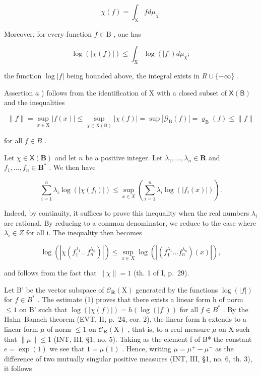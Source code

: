 \[
\chi (f) = \int_ {\mathrm{X}} f d \mu_ {\chi}.
\]

Moreover, for every function \(f \in \mathrm{B}\) , one has

\[
\log (| \chi (f) |) \leqslant \int_ {\mathrm{X}} \log (| f |) d \mu_ {\chi};
\]

the function \(\log|f|\) being bounded above, the integral exists in \(R \cup \{-\infty\}\) .

Assertion \(a\) ) follows from the identification of X with a closed subset of \(\mathsf{X}(\mathsf{B})\) and the inequalities

\[
\| f \| = \sup _ {x \in \mathrm{X}} | f (x) | \leqslant \sup _ {\chi \in \mathrm{X} (\mathrm{B})} | \chi (f) | = \sup | \mathcal {G} _ {\mathrm{B}} (f) | = \varrho_ {\mathrm{B}} (f) \leqslant \| f \|
\]

for all \(f \in B\) .

Let \(\chi \in \mathsf{X}(\mathbf{B})\) and let \(n\) be a positive integer. Let \(\lambda_1, \ldots, \lambda_n \in \mathbf{R}\) and \(f_1, \ldots, f_n \in \mathbf{B}^*\) . We then have

\[
\sum_ {i = 1} ^ {n} \lambda_ {i} \log (| \chi (f _ {i}) |) \leqslant \sup _ {x \in X} \left(\sum_ {i = 1} ^ {n} \lambda_ {i} \log (| f _ {i} (x) |)\right).\tag{1}
\]

Indeed, by continuity, it suffices to prove this inequality when the real numbers \(\lambda_{i}\) are rational. By reducing to a common denominator, we reduce to the case where \(\lambda_{i} \in Z\) for all i. The inequality then becomes

\[
\log \left(\left| \chi \left(f _ {1} ^ {\lambda_ {1}} \dots f _ {n} ^ {\lambda_ {n}}\right) \right|\right) \leqslant \sup _ {x \in X} \log \left(\left| \left(f _ {1} ^ {\lambda_ {1}} \dots f _ {n} ^ {\lambda_ {n}}\right) (x) \right|\right),
\]

and follows from the fact that \(\|\chi\|=1\) (th. 1 of I, p.~29).

Let B' be the vector subspace of \(\mathcal{C}_{\mathbf{R}}(\mathrm{X})\) generated by the functions \(\log(|f|)\) for \(f \in B^{*}\) . The estimate (1) proves that there exists a linear form h of norm \(\leqslant 1\) on B' such that \(\log(|\chi(f)|) = h(\log(|f|))\) for all \(f \in B^{*}\) . By the Hahn--Banach theorem (EVT, II, p.~24, cor. 2), the linear form h extends to a linear form \(\mu\) of norm \(\leqslant 1\) on \(\mathcal{C}_{\mathbf{R}}(\mathrm{X})\) , that is, to a real measure \(\mu\) on X such that \(\|\mu\| \leqslant 1\) (INT, III, §1, no. 5). Taking as the element f of B* the constant \(e = \exp(1)\) we see that \(1 = \mu(1)\) . Hence, writing \(\mu = \mu^{+} - \mu^{-}\) as the difference of two mutually singular positive measures (INT, III, §1, no. 6, th. 3), it follows

